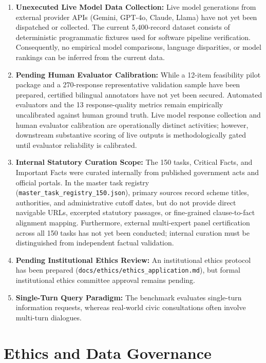\documentclass[11pt,a4paper]{article}
\begin{document}
\begin{enumerate}
  \item \textbf{Unexecuted Live Model Data Collection:} Live model generations from external provider APIs (Gemini, GPT-4o, Claude, Llama) have not yet been dispatched or collected. The current 5,400-record dataset consists of deterministic programmatic fixtures used for software pipeline verification. Consequently, no empirical model comparisons, language disparities, or model rankings can be inferred from the current data.
  \item \textbf{Pending Human Evaluator Calibration:} While a 12-item feasibility pilot package and a 270-response representative validation sample have been prepared, certified bilingual annotators have not yet been secured. Automated evaluators and the 13 response-quality metrics remain empirically uncalibrated against human ground truth. Live model response collection and human evaluator calibration are operationally distinct activities; however, downstream substantive scoring of live outputs is methodologically gated until evaluator reliability is calibrated.
  \item \textbf{Internal Statutory Curation Scope:} The 150 tasks, Critical Facts, and Important Facts were curated internally from published government acts and official portals. In the master task registry (\texttt{master\_task\_registry\_150.json}), primary sources record scheme titles, authorities, and administrative cutoff dates, but do not provide direct navigable URLs, excerpted statutory passages, or fine-grained clause-to-fact alignment mapping. Furthermore, external multi-expert panel certification across all 150 tasks has not yet been conducted; internal curation must be distinguished from independent factual validation.
  \item \textbf{Pending Institutional Ethics Review:} An institutional ethics protocol has been prepared (\texttt{docs/ethics/ethics\_application.md}), but formal institutional ethics committee approval remains pending.
  \item \textbf{Single-Turn Query Paradigm:} The benchmark evaluates single-turn information requests, whereas real-world civic consultations often involve multi-turn dialogues.
\end{enumerate}

\section{Ethics and Data Governance}
\label{sec:ethics}
\end{document}

